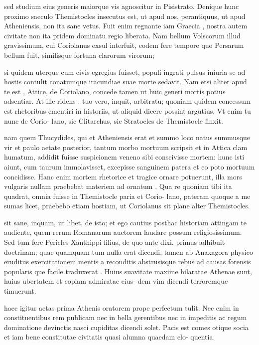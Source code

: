  sed studium eius generis maiorque vis agnoscitur in Pisistrato. Denique hunc proximo saeculo Themistocles insecutus est, ut apud nos, perantiquus, ut apud Atheniensis, non ita sane vetus. Fuit enim regnante iam Graecia , nostra autem civitate non ita pridem dominatu regio liberata. Nam bellum Volscorum illud gravissimum, cui Coriolanus exsul interfuit, eodem fere tempore quo Persarum bellum fuit, similisque fortuna clarorum virorum;

 si quidem uterque cum civis egregius fuisset, populi ingrati pulsus iniuria se ad hostis contulit conatumque iracundiae suae morte sedavit. Nam etsi aliter apud te est , Attice, de Coriolano, concede tamen ut huic generi mortis potius adsentiar. At ille ridens : tuo vero, inquit, arbitratu; quoniam quidem concessum est rhetoribus ementiri in historiis, ut aliquid dicere possint argutius. Vt enim tu nunc de Corio- lano, sic Clitarchus, sic Stratocles de Themistocle finxit.

 nam quem Thucydides, qui et Atheniensis erat et summo loco natus summusque vir et paulo aetate posterior, tantum morbo mortuum scripsit et in Attica clam humatum, addidit fuisse suspicionem veneno sibi conscivisse mortem: hunc isti aiunt, cum taurum immolavisset, excepisse sanguinem patera et eo poto mortuum concidisse. Hanc enim mortem rhetorice et tragice ornare potuerunt, illa mors vulgaris nullam praebebat materiem ad ornatum . Qua re quoniam tibi ita quadrat, omnia fuisse in Themistocle paria et Corio- lano, pateram quoque a me sumas licet, praebebo etiam hostiam, ut Coriolanus sit plane alter Themistocles.

 sit sane, inquam, ut libet, de isto; et ego cautius posthac historiam attingam te audiente, quem rerum Romanarum auctorem laudare possum religiosissimum. Sed tum fere Pericles Xanthippi filius, de quo ante dixi, primus adhibuit doctrinam; quae quamquam tum nulla erat dicendi, tamen ab Anaxagora physico eruditus exercitationem mentis a reconditis abstrusisque rebus ad causas forensis popularis que facile traduxerat . Huius suavitate maxime hilaratae Athenae sunt, huius ubertatem et copiam admiratae eius- dem vim dicendi terroremque timuerunt.

 haec igitur aetas prima Athenis oratorem prope perfectum tulit. Nec enim in constituentibus rem publicam nec in bella gerentibus nec in impeditis ac regum dominatione devinctis nasci cupiditas dicendi solet. Pacis est comes otique socia et iam bene constitutae civitatis quasi alumna quaedam elo- quentia.

